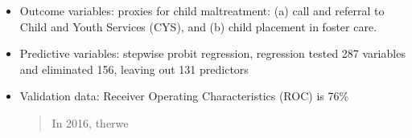 \documentclass{tufte-handout}
\begin{document}
\begin{itemize}
\begin{quote}
Writing down precise definitions that capture the essence of critical and very human ideas without becoming overly complex is something 
of an art form, and it is inevitable that in many settings, simplifications---sometimes painful ones---are necessary \dots [This] tension is not an artifact \dots it reflects the inherent difficulty of being precise about concepts that previously have been left vague, such as ``fairness." We believe that the only way to make algorithms better behaved is to begin by specifying what our goals for them might be in the first place (p. 12-13).\footnote{Kearns and Roth (2020), \textit{The Ethical Algorithm}, Oxford University Press}

\end{quote}


\subsection{Allegheny Family Screening Tool (AFST)}


\item[] Outcome variables: proxies for child maltreatment: (a) call and referral to Child and Youth Services (CYS), and (b) child placement in foster care.

\item[] Predictive variables: stepwise probit regression, regression tested 287 variables and eliminated 156, leaving out 131 predictors

\item[] Validation data: Receiver Operating Characteristics (ROC) is 76\%

\begin{quote}
In 2016, therwe 
\end{quote}




\end{itemize}
\end{document}

